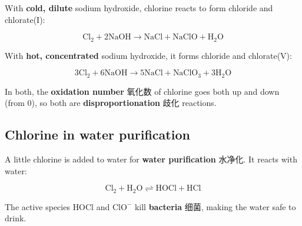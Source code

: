 \documentclass[11pt]{article}
\begin{document}
With \textbf{cold, dilute} sodium hydroxide, chlorine reacts to form chloride and chlorate(I):

\[
\text{Cl}_2 + 2\text{NaOH} \rightarrow \text{NaCl} + \text{NaClO} + \text{H}_2\text{O}
\]

With \textbf{hot, concentrated} sodium hydroxide, it forms chloride and chlorate(V):

\[
3\text{Cl}_2 + 6\text{NaOH} \rightarrow 5\text{NaCl} + \text{NaClO}_3 + 3\text{H}_2\text{O}
\]

In both, the \textbf{oxidation number} 氧化数 of chlorine goes both up and down (from $0$), so both are \textbf{disproportionation} 歧化 reactions.

\subsection*{Chlorine in water purification}

A little chlorine is added to water for \textbf{water purification} 水净化. It reacts with water:

\[
\text{Cl}_2 + \text{H}_2\text{O} \rightleftharpoons \text{HOCl} + \text{HCl}
\]

The active species $\text{HOCl}$ and $\text{ClO}^-$ kill \textbf{bacteria} 细菌, making the water safe to drink.
\end{document}
